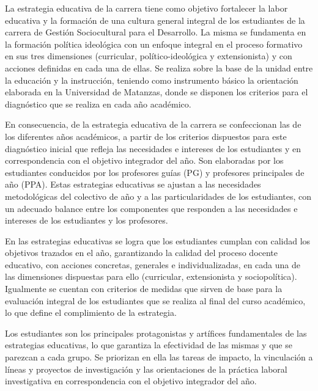 La estrategia educativa de la carrera tiene como objetivo fortalecer la labor educativa y la formación de una cultura general integral de los estudiantes de la carrera de Gestión Sociocultural para el Desarrollo. La misma se fundamenta en la formación política ideológica con un enfoque integral en el proceso formativo en sus tres dimensiones (curricular, político-ideológica y extensionista) y con acciones definidas en cada una de ellas. Se realiza sobre la base de la unidad entre la educación y la instrucción, teniendo como instrumento básico la orientación elaborada en la Universidad de Matanzas, donde se disponen los criterios para el diagnóstico que se realiza en cada año académico. 

En consecuencia, de la estrategia educativa de la carrera se confeccionan las de los diferentes años académicos, a partir de los criterios dispuestos para este diagnóstico inicial que refleja las necesidades e intereses de los estudiantes y en correspondencia con el objetivo integrador del año. Son elaboradas por los estudiantes conducidos por los profesores guías (PG) y profesores principales de año (PPA). Estas estrategias educativas se ajustan a las necesidades metodológicas del colectivo de año y a las particularidades de los estudiantes, con un adecuado balance entre los componentes que responden a las necesidades e intereses de los estudiantes y los profesores.
 
En las estrategias educativas se logra que los estudiantes cumplan con calidad los objetivos trazados en el año, garantizando la calidad del proceso docente educativo, con acciones concretas, generales e individualizadas, en cada una de las dimensiones dispuestas para ello (curricular, extensionista y sociopolítica). Igualmente se cuentan con criterios de medidas que sirven de base para la evaluación integral de los estudiantes que se realiza al final del curso académico, lo que define el complimiento de la estrategia. 

Los estudiantes son los principales protagonistas y artífices fundamentales de las estrategias educativas, lo que garantiza la efectividad de las mismas y que se parezcan a cada grupo. Se priorizan en ella las tareas de impacto, la vinculación a líneas y proyectos de investigación y las orientaciones de la práctica laboral investigativa en correspondencia con el objetivo integrador del año.